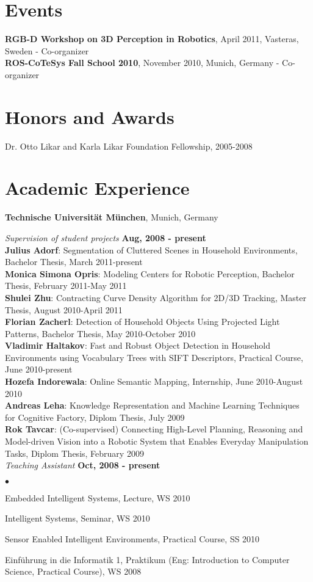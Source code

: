 \documentclass[margin,line]{res}
\newenvironment{list2}{
  \begin{list}{$\bullet$}{%
      \setlength{\itemsep}{0in}
      \setlength{\parsep}{0in} \setlength{\parskip}{0in}
      \setlength{\topsep}{0in} \setlength{\partopsep}{0in} 
      \setlength{\leftmargin}{0.2in}}}{\end{list}}
\begin{document}
\begin{resume}
\section{\sc Events} 
\textbf{RGB-D Workshop on 3D Perception in Robotics}, April 2011, Vasteras, Sweden - Co-organizer\\
\textbf{ROS-CoTeSys Fall School 2010}, November 2010, Munich, Germany - Co-organizer
\section{\sc Honors and Awards} 
Dr. Otto Likar and Karla Likar Foundation Fellowship, 2005-2008
\section{\sc Academic Experience}
{\bf Technische Universit\"at M\"unchen}, Munich, Germany\\
\vspace{-.3cm}

{\em Supervision of student projects} \hfill {\bf Aug, 2008  - present} \\
\textbf{Julius Adorf}: Segmentation of Cluttered Scenes in Household Environments, Bachelor Thesis, March 2011-present\\
\textbf{Monica Simona Opris}: Modeling Centers for Robotic Perception, Bachelor Thesis, February 2011-May 2011\\
\textbf{Shulei Zhu}: Contracting Curve Density Algorithm for 2D/3D Tracking, Master Thesis, August 2010-April 2011\\
\textbf{Florian Zacherl}: Detection of Household Objects Using Projected Light Patterns, Bachelor Thesis, May 2010-October 2010\\
\textbf{Vladimir Haltakov}: Fast and Robust Object Detection in Household Environments using Vocabulary Trees with SIFT Descriptors, 
Practical Course, June 2010-present\\
\textbf{Hozefa Indorewala}: Online Semantic Mapping, Internship, June 2010-August 2010\\
\textbf{Andreas Leha}: Knowledge Representation and Machine Learning Techniques 
for Cognitive Factory, Diplom Thesis, July 2009\\
\textbf{Rok Tavcar}: (Co-supervised) Connecting High-Level Planning, Reasoning and 
Model-driven Vision into a Robotic System that Enables Everyday Manipulation Tasks,
Diplom Thesis, February 2009\\
{\em Teaching Assistant} \hfill {\bf Oct, 2008  - present}\\
\begin{list2}
\item Embedded Intelligent Systems, Lecture, WS 2010
\item Intelligent Systems, Seminar, WS 2010
\item Sensor Enabled Intelligent Environments, Practical Course, SS 2010
\item Einf\"uhrung in die Informatik 1, Praktikum (Eng: 
Introduction to Computer Science, Practical Course), WS 2008
\end{list2}


\end{resume}
\end{document}
